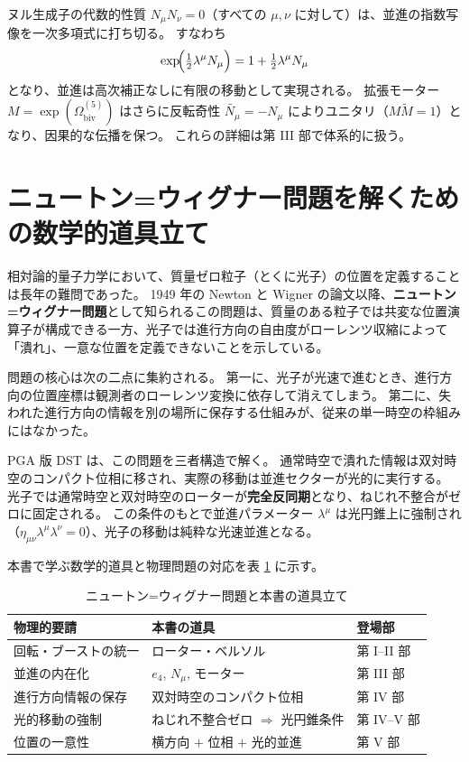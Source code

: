 \documentclass[dvipdfmx,a4paper,oneside]{jsbook}
\numberwithin{equation}{chapter}
\begin{document}
ヌル生成子の代数的性質 \(N_\mu N_\nu = 0\)（すべての \(\mu, \nu\) に対して）は、並進の指数写像を一次多項式に打ち切る。
すなわち
\[
\exp\!\Bigl(\tfrac{1}{2}\lambda^\mu N_\mu\Bigr)
= 1 + \tfrac{1}{2}\lambda^\mu N_\mu
\]
となり、並進は高次補正なしに有限の移動として実現される。
拡張モーター \(M = \exp(\Omega_{\mathrm{biv}}^{(5)})\) はさらに反転奇性 \(\widetilde{N_\mu} = -N_\mu\) によりユニタリ（\(M\widetilde{M} = 1\)）となり、因果的な伝播を保つ。
これらの詳細は第 III 部で体系的に扱う。

\section*{ニュートン=ウィグナー問題を解くための数学的道具立て}

相対論的量子力学において、質量ゼロ粒子（とくに光子）の位置を定義することは長年の難問であった。
1949 年の Newton と Wigner の論文以降、\textbf{ニュートン=ウィグナー問題}として知られるこの問題は、質量のある粒子では共変な位置演算子が構成できる一方、光子では進行方向の自由度がローレンツ収縮によって「潰れ」、一意な位置を定義できないことを示している。

問題の核心は次の二点に集約される。
第一に、光子が光速で進むとき、進行方向の位置座標は観測者のローレンツ変換に依存して消えてしまう。
第二に、失われた進行方向の情報を別の場所に保存する仕組みが、従来の単一時空の枠組みにはなかった。

PGA 版 DST は、この問題を三者構造で解く。
通常時空で潰れた情報は双対時空のコンパクト位相に移され、実際の移動は並進セクターが光的に実行する。
光子では通常時空と双対時空のローターが\textbf{完全反同期}となり、ねじれ不整合がゼロに固定される。
この条件のもとで並進パラメーター \(\lambda^\mu\) は光円錐上に強制され（\(\eta_{\mu\nu}\lambda^\mu\lambda^\nu = 0\)）、光子の移動は純粋な光速並進となる。

本書で学ぶ数学的道具と物理問題の対応を表 \ref{tab:tools-nw} に示す。

\begin{table}[htbp]
  \centering
  \caption{ニュートン=ウィグナー問題と本書の道具立て}
  \label{tab:tools-nw}
  \begin{tabular}{@{}lll@{}}
    \toprule
    物理的要請 & 本書の道具 & 登場部 \\
    \midrule
    回転・ブーストの統一 & ローター・ベルソル & 第 I--II 部 \\
    並進の内在化 & \(e_4\), \(N_\mu\), モーター & 第 III 部 \\
    進行方向情報の保存 & 双対時空のコンパクト位相 & 第 IV 部 \\
    光的移動の強制 & ねじれ不整合ゼロ \(\Rightarrow\) 光円錐条件 & 第 IV--V 部 \\
    位置の一意性 & 横方向 \(+\) 位相 \(+\) 光的並進 & 第 V 部 \\
    \bottomrule
  \end{tabular}
\end{table}
\end{document}

